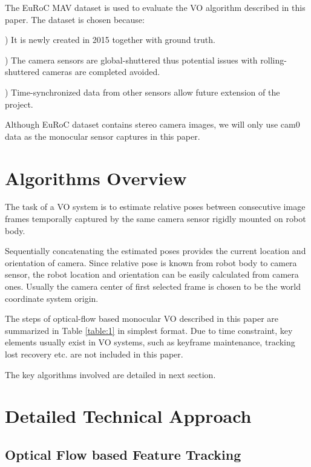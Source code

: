 \documentclass[10pt,twocolumn,letterpaper]{article}
\begin{document}
The EuRoC MAV dataset \cite{Burri25012016} is used to evaluate the VO algorithm described in this paper. The dataset is chosen because:

) It is newly created in 2015 together with ground truth.

) The camera sensors are global-shuttered thus potential issues with rolling-shuttered cameras are completed avoided. 

) Time-synchronized data from other sensors allow future extension of the project.  

Although EuRoC dataset contains stereo camera images, we will only use cam0 data as the monocular sensor captures in this paper.  

\section{Algorithms Overview}

The task of a VO system is to estimate relative poses between consecutive image frames temporally captured by the same camera sensor rigidly mounted on robot body. 

Sequentially concatenating the estimated poses provides the current location and orientation of camera. Since relative pose is known from robot body to camera sensor, the robot location and orientation can be easily calculated from camera ones. Usually the camera center of first selected frame is chosen to be the world coordinate system origin. 

The steps of optical-flow based monocular VO described in this paper are summarized in Table \ref{table:1} in simplest format. Due to time constraint, key elements usually exist in VO systems, such as keyframe maintenance, tracking lost recovery etc. are not included in this paper. 


The key algorithms involved are detailed in next section. 


\section{Detailed Technical Approach}

\subsection{Optical Flow based Feature Tracking}
\end{document}
